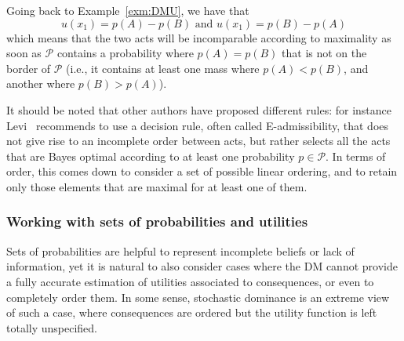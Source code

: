 \documentclass[french, english]{llncs}
\begin{document}
	\begin{example}
		Going back to Example~\ref{exm:DMU}, we have that 
		$$u(x_1)=p(A) - p(B) \textrm{ and } u(x_1)=p(B) - p(A)$$
		which means that the two acts will be incomparable according to maximality as soon as $\mathcal{P}$ contains a probability where $p(A)=p(B)$ that is not on the border of $\mathcal{P}$ (i.e., it contains at least one mass where $p(A)<p(B)$, and another where $p(B)>p(A)$). 
	\end{example}
	
	It should be noted that other authors have proposed different rules: for instance Levi~\cite{levi_enterprise_1983} recommends to use a decision rule, often called E-admissibility, that does not give rise to an incomplete order between acts, but rather selects all the acts that are Bayes optimal according to at least one probability $p \in \mathcal{P}$. In terms of order, this comes down to consider a set of possible linear ordering, and to retain only those elements that are maximal for at least one of them. 
	
	
	\subsubsection{Working with sets of probabilities and utilities}
	
	Sets of probabilities are helpful to represent incomplete beliefs or lack of information, yet it is natural to also consider cases where the \ac{DM} cannot provide a fully accurate estimation of utilities associated to consequences, or even to completely order them. In some sense, stochastic dominance is an extreme view of such a case, where consequences are ordered but the utility function is left totally unspecified. 
	
\end{document}
